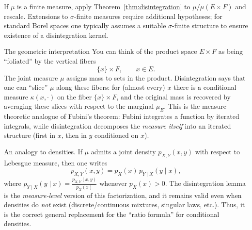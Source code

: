 \begin{remark}
If $\mu$ is a finite measure, apply Theorem~\ref{thm:disintegration} to $\mu/\mu(E\times F)$ and rescale.
Extensions to $\sigma$-finite measures require additional hypotheses; for standard Borel spaces one typically assumes a suitable $\sigma$-finite structure
to ensure existence of a disintegration kernel.
\end{remark}

\begin{remark}{The geometric interpretation}
You can think of the product space $E\times F$ as being ``foliated'' by the vertical fibers
\[
\{x\}\times F,\qquad x\in E.
\]
The joint measure $\mu$ assigns mass to sets in the product.
Disintegration says that one can ``slice'' $\mu$ along these fibers:
for (almost every) $x$ there is a conditional measure $\kappa(x,\cdot)$ on the fiber $\{x\}\times F$,
and the original mass is recovered by averaging these slices with respect to the marginal $\mu_E$.
This is the measure-theoretic analogue of Fubini's theorem:
Fubini integrates a function by iterated integrals, while disintegration decomposes the \emph{measure itself}
into an iterated structure (first in $x$, then in $y$ conditioned on $x$).
\end{remark}

\begin{remark}{An analogy to densities.}
If $\mu$ admits a joint density $p_{X,Y}(x,y)$ with respect to Lebesgue measure, then one writes
\[
p_{X,Y}(x,y)=p_X(x)\,p_{Y\mid X}(y\mid x),
\]
where $p_{Y\mid X}(y\mid x)=\frac{p_{X,Y}(x,y)}{p_X(x)}$ whenever $p_X(x)>0$.
The disintegration lemma is the \emph{measure-level} version of this factorization,
and it remains valid even when densities do \emph{not} exist (discrete/continuous mixtures, singular laws, etc.).
Thus, it is the correct general replacement for the ``ratio formula'' for conditional densities.
\end{remark}